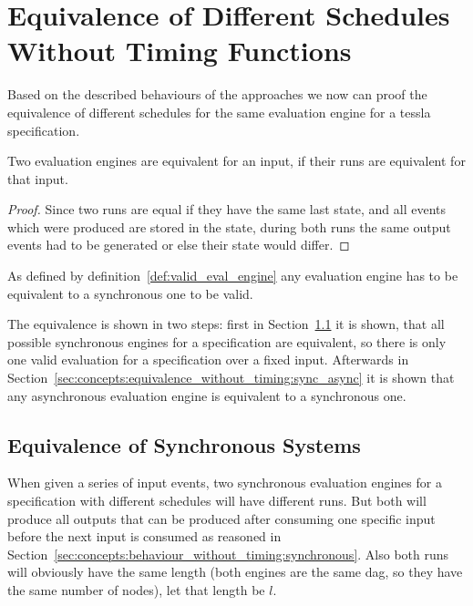 \section{Equivalence of Different Schedules Without Timing Functions}
\label{sec:concepts:equivalence_without_timing}

Based on the described behaviours of the approaches we now can proof the equivalence of different schedules for the same evaluation engine for a \gls{tessla} specification.

\begin{lemma}[name = Equivalence of Engines for one Input]\label{lemma:eval_equivalent_if_runs_equal}
  Two evaluation engines are equivalent for an input, if their runs are equivalent for that input.
\end{lemma}

\begin{proof}
  Since two runs are equal if they have the same last state, and all events which were produced are stored in the state, during both runs the same output events had to be generated or else their state would differ.
\end{proof}

As defined by definition~\ref{def:valid_eval_engine} any evaluation engine has to be equivalent to a synchronous one to be valid.

The equivalence is shown in two steps: first in Section~\ref{sec:concepts:equivalence_without_timing:synchronous} it is shown, that all possible synchronous engines for a specification are equivalent, so there is only one valid evaluation for a specification over a fixed input.
Afterwards in Section~\ref{sec:concepts:equivalence_without_timing:sync_async} it is shown that any asynchronous evaluation engine is equivalent to a synchronous one.


\subsection{Equivalence of Synchronous Systems}
\label{sec:concepts:equivalence_without_timing:synchronous}

When given a series of input events, two synchronous evaluation engines for a specification with different schedules will have different runs.
But both will produce all outputs that can be produced after consuming one specific input before the next input is consumed as reasoned in Section~\ref{sec:concepts:behaviour_without_timing:synchronous}.
Also both runs will obviously have the same length (both engines are the same \gls{dag}, so they have the same number of nodes), let that length be \(l\).

